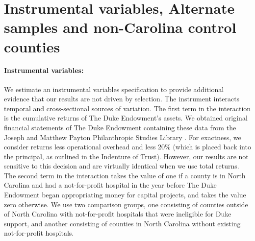 \documentclass[12pt]{article}
\begin{document}

\FloatBarrier
\newpage
\section{Instrumental variables, Alternate samples and non-Carolina control counties \label{sec:iv-non-nc}}
\setcounter{table}{0}
\setcounter{figure}{0}
\onehalfspacing

\paragraph{Instrumental variables:} We estimate an instrumental variables specification to provide additional evidence that our results are not driven by selection. 
The instrument interacts temporal and cross-sectional sources of variation. 
The first term in the interaction is the cumulative returns of The Duke Endowment's assets. 
We obtained original financial statements of The Duke Endowment containing these data from the Joseph and Matthew Payton Philanthropic Studies Library . 
For exactness, we consider returns less operational overhead and less 20\% (which is placed back into the principal, as outlined in the Indenture of Trust). 
However, our results are not sensitive to this decision and are virtually identical when we use total returns. 
The second term in the interaction takes the value of one if a county is in North Carolina and had a not-for-profit hospital in the year before The Duke Endowment began appropriating money for capital projects, and takes the value zero otherwise. 
We use two comparison groups, one consisting of counties outside of North Carolina with not-for-profit hospitals that were ineligible for Duke support, and another consisting of counties in North Carolina without existing not-for-profit hospitals. 
\end{document}
